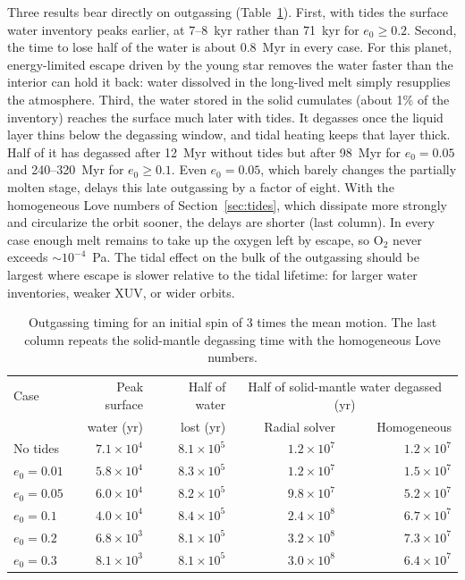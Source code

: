 \documentclass[11pt]{article}
\begin{document}
Three results bear directly on outgassing (Table~\ref{tab:outgassing}). First, with tides the surface water inventory peaks earlier, at 7--8~kyr rather than 71~kyr for $e_0 \ge 0.2$. Second, the time to lose half of the water is about 0.8~Myr in every case. For this planet, energy-limited escape driven by the young star removes the water faster than the interior can hold it back: water dissolved in the long-lived melt simply resupplies the atmosphere. Third, the water stored in the solid cumulates (about 1\% of the inventory) reaches the surface much later with tides. It degasses once the liquid layer thins below the degassing window, and tidal heating keeps that layer thick. Half of it has degassed after 12~Myr without tides but after 98~Myr for $e_0 = 0.05$ and 240--320~Myr for $e_0 \ge 0.1$. Even $e_0 = 0.05$, which barely changes the partially molten stage, delays this late outgassing by a factor of eight. With the homogeneous Love numbers of Section~\ref{sec:tides}, which dissipate more strongly and circularize the orbit sooner, the delays are shorter (last column). In every case enough melt remains to take up the oxygen left by escape, so O$_2$ never exceeds $\sim 10^{-4}$~Pa. The tidal effect on the bulk of the outgassing should be largest where escape is slower relative to the tidal lifetime: for larger water inventories, weaker XUV, or wider orbits.

\begin{table}[h]
\centering
\caption{Outgassing timing for an initial spin of 3 times the mean motion. The last column repeats the solid-mantle degassing time with the homogeneous Love numbers.}
\label{tab:outgassing}
\begin{tabular}{lrrrr}
\toprule
Case & Peak surface & Half of water & \multicolumn{2}{c}{Half of solid-mantle water degassed (yr)} \\
 & water (yr) & lost (yr) & Radial solver & Homogeneous \\
\midrule
No tides & $7.1 \times 10^4$ & $8.1 \times 10^5$ & $1.2 \times 10^7$ & $1.2 \times 10^7$ \\
$e_0 = 0.01$ & $5.8 \times 10^4$ & $8.3 \times 10^5$ & $1.2 \times 10^7$ & $1.5 \times 10^7$ \\
$e_0 = 0.05$ & $6.0 \times 10^4$ & $8.2 \times 10^5$ & $9.8 \times 10^7$ & $5.2 \times 10^7$ \\
$e_0 = 0.1$ & $4.0 \times 10^4$ & $8.4 \times 10^5$ & $2.4 \times 10^8$ & $6.7 \times 10^7$ \\
$e_0 = 0.2$ & $6.8 \times 10^3$ & $8.1 \times 10^5$ & $3.2 \times 10^8$ & $7.3 \times 10^7$ \\
$e_0 = 0.3$ & $8.1 \times 10^3$ & $8.1 \times 10^5$ & $3.0 \times 10^8$ & $6.4 \times 10^7$ \\
\bottomrule
\end{tabular}
\end{table}
\end{document}
